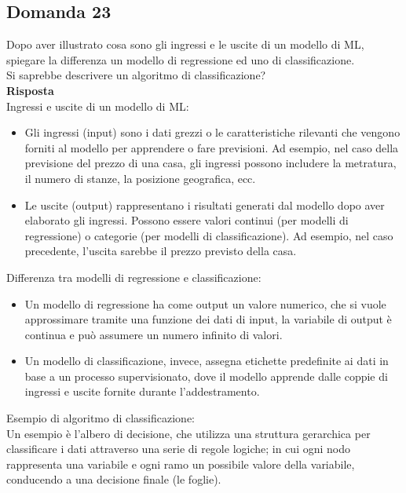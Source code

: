 \documentclass[../main.tex]{subfiles}
\begin{document}
	\subsection{Domanda 23}
	Dopo aver illustrato cosa sono gli ingressi e le uscite di un modello di ML, spiegare la differenza un modello di regressione ed uno di classificazione.\\
	Si saprebbe descrivere un algoritmo di classificazione?\\
	\textbf{Risposta}\\
	Ingressi e uscite di un modello di ML:
	\begin{itemize}
		\item Gli ingressi (input) sono i dati grezzi o le caratteristiche rilevanti che vengono forniti al modello per apprendere o fare previsioni. Ad esempio, nel caso della previsione del prezzo di una casa, gli ingressi possono includere la metratura, il numero di stanze, la posizione geografica, ecc.
		\item Le uscite (output) rappresentano i risultati generati dal modello dopo aver elaborato gli ingressi. Possono essere valori continui (per modelli di regressione) o categorie (per modelli di classificazione). Ad esempio, nel caso precedente, l'uscita sarebbe il prezzo previsto della casa.
	\end{itemize}
	Differenza tra modelli di regressione e classificazione:
	\begin{itemize}
		\item Un modello di regressione ha come output un valore numerico, che si vuole approssimare tramite una funzione dei dati di input, la variabile di output è continua e può assumere un numero infinito di valori.
		\item Un modello di classificazione, invece, assegna etichette predefinite ai dati in base a un processo supervisionato, dove il modello apprende dalle coppie di ingressi e uscite fornite durante l'addestramento.
	\end{itemize}
	Esempio di algoritmo di classificazione:\\
	Un esempio è l'albero di decisione, che utilizza una struttura gerarchica per classificare i dati attraverso una serie di regole logiche; in cui ogni nodo rappresenta una variabile e ogni ramo un possibile valore della variabile, conducendo a una decisione finale (le foglie).
\end{document}
